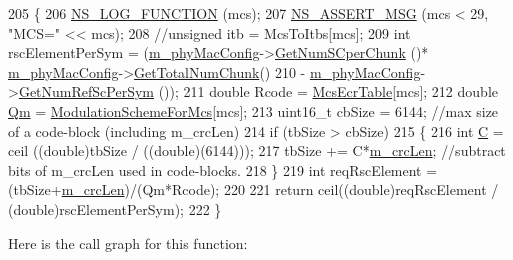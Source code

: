 \begin{DoxyCode}
205 \{
206         \hyperlink{log-macros-disabled_8h_a90b90d5bad1f39cb1b64923ea94c0761}{NS\_LOG\_FUNCTION} (mcs);
207         \hyperlink{assert_8h_aff5ece9066c74e681e74999856f08539}{NS\_ASSERT\_MSG} (mcs < 29, \textcolor{stringliteral}{"MCS="} << mcs);
208         \textcolor{comment}{//unsigned itb = McsToItbs[mcs];}
209         \textcolor{keywordtype}{int} rscElementPerSym = (\hyperlink{classns3_1_1MmWaveAmc_ae2bd45429e23c9091597462d888e8d6f}{m\_phyMacConfig}->\hyperlink{classns3_1_1MmWavePhyMacCommon_a724771405a9e4d3e2ee251be4aff8abc}{GetNumSCperChunk} ()*
      \hyperlink{classns3_1_1MmWaveAmc_ae2bd45429e23c9091597462d888e8d6f}{m\_phyMacConfig}->\hyperlink{classns3_1_1MmWavePhyMacCommon_a97e82c809a351fea9d5058ac1bb4c3c6}{GetTotalNumChunk}()
210                         - \hyperlink{classns3_1_1MmWaveAmc_ae2bd45429e23c9091597462d888e8d6f}{m\_phyMacConfig}->\hyperlink{classns3_1_1MmWavePhyMacCommon_a4255231004e45cc9b3df0ceb791353db}{GetNumRefScPerSym} ());
211         \textcolor{keywordtype}{double} Rcode = \hyperlink{namespacens3_a5e80c75db664b51189d262e55aba06be}{McsEcrTable}[mcs];
212         \textcolor{keywordtype}{double} \hyperlink{loss__ITU1411__NLOS__over__rooftop_8m_a5bda9815415e83db7d9a9adf5ca84fd2}{Qm} = \hyperlink{namespacens3_ae77af3b468826ac14e69fe8175220f80}{ModulationSchemeForMcs}[mcs];
213         uint16\_t cbSize = 6144;  \textcolor{comment}{//max size of a code-block (including m\_crcLen)}
214         \textcolor{keywordflow}{if} (tbSize > cbSize)
215         \{
216                 \textcolor{keywordtype}{int} \hyperlink{generate__test__data__lte__sinr_8m_ae24bb667d5023e5aaa1e71c3a15e447e}{C} = ceil ((\textcolor{keywordtype}{double})tbSize / ((\textcolor{keywordtype}{double})(6144)));
217                 tbSize += C*\hyperlink{classns3_1_1MmWaveAmc_a11a852907226e549ff50ec3b7248f0ad}{m\_crcLen}; \textcolor{comment}{//subtract bits of m\_crcLen used in code-blocks.}
218         \}
219         \textcolor{keywordtype}{int} reqRscElement = (tbSize+\hyperlink{classns3_1_1MmWaveAmc_a11a852907226e549ff50ec3b7248f0ad}{m\_crcLen})/(Qm*Rcode);
220 
221         \textcolor{keywordflow}{return} ceil((\textcolor{keywordtype}{double})reqRscElement / (\textcolor{keywordtype}{double})rscElementPerSym);
222 \}
\end{DoxyCode}


Here is the call graph for this function\+:


